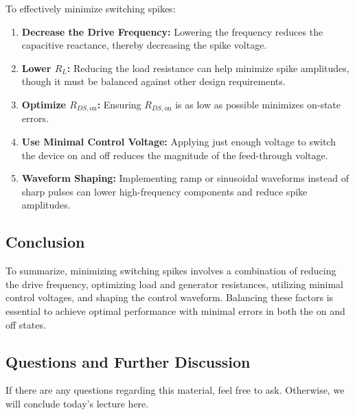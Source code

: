 To effectively minimize switching spikes:

\begin{enumerate}
    \item \textbf{Decrease the Drive Frequency:} Lowering the frequency reduces the capacitive reactance, thereby decreasing the spike voltage.
    
    \item \textbf{Lower \( R_L \):} Reducing the load resistance can help minimize spike amplitudes, though it must be balanced against other design requirements.
    
    \item \textbf{Optimize \( R_{DS,\text{on}} \):} Ensuring \( R_{DS,\text{on}} \) is as low as possible minimizes on-state errors.
    
    \item \textbf{Use Minimal Control Voltage:} Applying just enough voltage to switch the device on and off reduces the magnitude of the feed-through voltage.
    
    \item \textbf{Waveform Shaping:} Implementing ramp or sinusoidal waveforms instead of sharp pulses can lower high-frequency components and reduce spike amplitudes.
\end{enumerate}

\subsection{Conclusion}

To summarize, minimizing switching spikes involves a combination of reducing the drive frequency, optimizing load and generator resistances, utilizing minimal control voltages, and shaping the control waveform. Balancing these factors is essential to achieve optimal performance with minimal errors in both the on and off states.

\subsection{Questions and Further Discussion}

If there are any questions regarding this material, feel free to ask. Otherwise, we will conclude today's lecture here.

